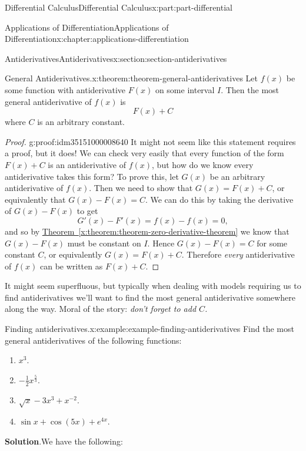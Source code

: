 \documentclass[twoside,10pt,]{tufte-book}
\newcommand{\blocktitlefont}{\relax}
\newcommand{\xreffont}{\relax}
\numberwithin{equation}{part}
\begin{document}
\begin{partptx}{Differential Calculus}{}{Differential Calculus}{}{}{x:part:part-differential}
\begin{chapterptx}{Applications of Differentiation}{}{Applications of Differentiation}{}{}{x:chapter:applications-differentiation}
\begin{sectionptx}{Antiderivatives}{}{Antiderivatives}{}{}{x:section:section-antiderivatives}
\begin{theorem}{General Antiderivatives.}{}{x:theorem:theorem-general-antiderivatives}%
Let \(f(x)\) be some function with antiderivative \(F(x)\) on some interval \(I\). Then the most general antiderivative of \(f(x)\) is%
\begin{equation*}
F(x) + C
\end{equation*}
where \(C\) is an arbitrary constant.%
\end{theorem}
\begin{proof}{}{g:proof:idm35151000008640}
It might not seem like this statement requires a proof, but it does! We can check very easily that every function of the form \(F(x)+C\) is an antiderivative of \(f(x)\), but how do we know every antiderivative takes this form? To prove this, let \(G(x)\) be an arbitrary antiderivative of \(f(x)\). Then we need to show that \(G(x) = F(x) + C\), or equivalently that \(G(x) - F(x) = C\). We can do this by taking the derivative of \(G(x) - F(x)\) to get%
\begin{equation*}
G'(x) - F'(x) = f(x) - f(x) = 0,
\end{equation*}
and so by \hyperref[x:theorem:theorem-zero-derivative-theorem]{Theorem~{\xreffont\ref{x:theorem:theorem-zero-derivative-theorem}}} we know that \(G(x) - F(x)\) must be constant on \(I\). Hence \(G(x) - F(x) = C\) for some constant \(C\), or equivalently \(G(x) = F(x)+C\). Therefore \emph{every} antiderivative of \(f(x)\) can be written as \(F(x) + C\).%
\end{proof}
It might seem superfluous, but typically when dealing with models requiring us to find antiderivatives we'll want to find the most general antiderivative somewhere along the way. Moral of the story: \emph{don't forget to add \(C\).}%
\begin{example}{Finding antiderivatives.}{x:example:example-finding-antiderivatives}%
Find the most general antiderivatives of the following functions:%
\begin{enumerate}
\item{}\(\displaystyle x^{3}.\)%
\item{}\(\displaystyle -\frac{1}{2}x^{\frac{5}{3}}.\)%
\item{}\(\displaystyle \sqrt{x} - 3x^{3} + x^{-2}.\)%
\item{}\(\displaystyle \sin x + \cos (5x) + e^{4x}.\)%
\end{enumerate}
%
\par\smallskip%
\noindent\textbf{\blocktitlefont Solution}.\hypertarget{g:solution:idm35150999997760}{}\quad{}We have the following:%

\end{example}
\end{sectionptx}
\end{chapterptx}
\end{partptx}
\end{document}
